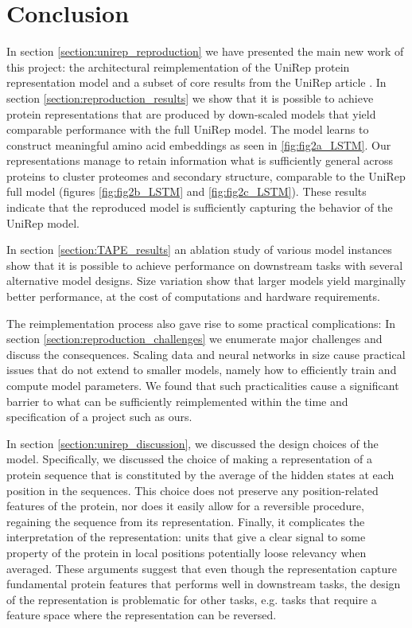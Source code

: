 \documentclass[a4paper,12pt]{article}
\begin{document}
\section{Conclusion}
In section \ref{section:unirep_reproduction} we have presented the main new work of this project: the architectural reimplementation of the UniRep protein representation model and a subset of core results from the UniRep article \cite{alley2019unified}. In section \ref{section:reproduction_results} we show that it is possible to achieve protein representations that are produced by down-scaled models that yield comparable performance with the full UniRep model. The model learns to construct meaningful amino acid embeddings as seen in \ref{fig:fig2a_LSTM}. Our representations manage to retain information what is sufficiently general across proteins to cluster proteomes and secondary structure, comparable to the UniRep full model (figures \ref{fig:fig2b_LSTM} and \ref{fig:fig2c_LSTM}). These results indicate that the reproduced model is sufficiently capturing the behavior of the UniRep model. 

In section \ref{section:TAPE_results} an ablation study of various model instances show that it is possible to achieve performance on downstream tasks with several alternative model designs. Size variation show that larger models yield marginally better performance, at the cost of computations and hardware requirements.

The reimplementation process also gave rise to some practical complications: In section \ref{section:reproduction_challenges} we enumerate major challenges and discuss the consequences. Scaling data and neural networks in size cause practical issues that do not extend to smaller models, namely how to efficiently train and compute model parameters. We found that such practicalities cause a significant barrier to what can be sufficiently reimplemented within the time and specification of a project such as ours.

In section \ref{section:unirep_discussion}, we discussed the design choices of the model. Specifically, we discussed the choice of making a representation of a protein sequence that is constituted by the average of the hidden states at each position in the sequences. This choice does not preserve any position-related features of the protein, nor does it easily allow for a reversible procedure, regaining the sequence from its representation. Finally, it complicates the interpretation of the representation: units that give a clear signal to some property of the protein in local positions potentially loose relevancy when averaged. These arguments suggest that even though the representation capture fundamental protein features that performs well in downstream tasks, the design of the representation is problematic for other tasks, e.g. tasks that require a feature space where the representation can be reversed.
\end{document}
